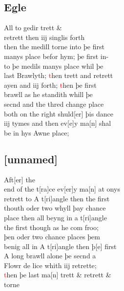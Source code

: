 \documentclass[12pt,letter]{article} %
\newcommand{\red}[1]{\textcolor{red}{#1}}
\newcommand{\srcpg}[1]{
    \noindent{
        \color{Gray}{\rule[0.5ex]{\linewidth}{1pt}~#1} 
        \\
    }
}
\begin{document}
\subsection{Egle}
All to gedir trett \& \\ 
retrett then iij singlis forth \\
\srcpg{57} then the medill torne into þe first \\ 
manys place befor hym; þe first in-\\
to þe medils manys place whil þe \\
last Brawlyth; \red{t}hen trett and retrett \\
ayen and iij forth; \red{t}hen þe first \\
brawll as he standith whill þe \\
secnd and the thred change place \\
both on the right shuld{[}er{]} þis dance \\
iij tymes and then ev{[}e{]}y ma{[}n{]} shal \\
be in hys Awne place;

\subsection{{[}unnamed{]}}
Aft{[}er{]} the \\
end of the t{[}ra{]}ce ev{[}er{]}y ma{[}n{]} at onys \\
retrett to A t{[}ri{]}angle then the first \\
thouth oder two whyll þay chance \\
place then all beyng in a t{[}ri{]}angle \\
the first though as he com froo; \\
þen oder two chance places þem \\
benig all in A t{[}ri{]}angle then þ{[}e{]} first \\
\srcpg{58} A long brawll alone þe secnd a \\
Flowr de lice whith iij retrette; \\
\red{t}hen þe last ma{[}n{]} trett \& retrett \& \\
torne
\end{document}
